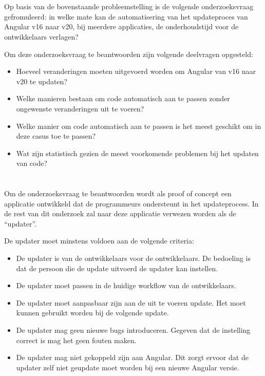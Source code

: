 \section{}%
\label{sec:onderzoeksvraag}

Op basis van de bovenstaande probleemstelling is de volgende onderzoeksvraag gefromuleerd: in welke mate kan de automatisering van het updateproces van Angular v16 naar v20, bij meerdere applicaties, de onderhoudstijd voor de ontwikkelaars verlagen?

Om deze onderzoeksvraag te beantwoorden zijn volgende deelvragen opgesteld:
\begin{itemize}
  \item Hoeveel veranderingen moeten uitgevoerd worden om Angular van v16 naar v20 te updaten?
  \item Welke manieren bestaan om code automatisch aan te passen zonder ongewenste veranderingen uit te voeren?
  \item Welke manier om code automatisch aan te passen is het meest geschikt om in deze casus toe te passen?
  \item Wat zijn statistisch gezien de meest voorkomende problemen bij het updaten van code?
\end{itemize}

\section{}%
\label{sec:onderzoeksdoelstelling}

Om de onderzoeksvraag te beantwoorden wordt als proof of concept een applicatie ontwikkeld dat de programmeurs ondersteunt in het updateprocess.
In de rest van dit onderzoek zal naar deze applicatie verwezen worden als de ``updater''.

De updater moet minstens voldoen aan de volgende criteria:

\begin{itemize}
  \item De updater is van de ontwikkelaars voor de ontwikkelaars. De bedoeling is dat de persoon die de update uitvoerd de updater kan instellen.
  \item De updater moet passen in de huidige workflow van de ontwikkelaars.
  \item De updater moet aanpasbaar zijn aan de uit te voeren update. Het moet kunnen gebruikt worden bij de volgende update.
  \item De updater mag geen nieuwe bugs introduceren. Gegeven dat de instelling correct is mag het geen fouten maken.
  \item De updater mag niet gekoppeld zijn aan Angular. Dit zorgt ervoor dat de updater zelf niet geupdate moet worden bij een nieuwe Angular versie.
\end{itemize}

